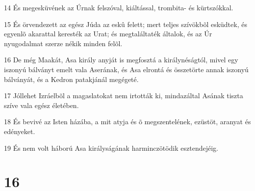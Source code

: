 \par 14 És megesküvének az Úrnak felszóval, kiáltással, trombita- és kürtszókkal.
\par 15 És örvendezett az egész Júda az eskû felett; mert teljes szívökbõl esküdtek, és egyenlõ akarattal keresték az Urat; és megtaláltaték általok, és az Úr nyugodalmat szerze nékik minden felõl.
\par 16 De még Maakát, Asa király anyját is megfosztá a királynéságtól, mivel egy iszonyú bálványt emelt vala Aserának, és Asa elrontá és összetörte annak iszonyú bálványát, és a Kedron patakjánál  megégeté.
\par 17 Jóllehet Izráelbõl a magaslatokat nem irtották ki, mindazáltal Asának tiszta szíve vala egész életében.
\par 18 És bevivé az Isten házába, a mit atyja és õ megszentelének, ezüstöt, aranyat és edényeket.
\par 19 És nem volt háború Asa királyságának harminczötödik esztendejéig.

\chapter{16}

